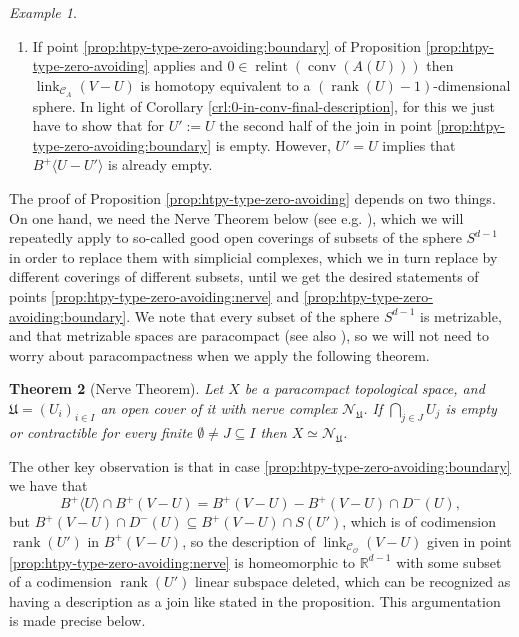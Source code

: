 \documentclass[a4paper,11pt,reqno, english]{amsart}
\newtheorem{theorem}{Theorem}[section]
\theoremstyle{definition}
\theoremstyle{remark}
\newtheorem{example}[theorem]{Example}
\newcommand\R{\mathbb R}
\DeclareMathOperator{\link}{\mathrm{link}}
\DeclareMathOperator{\relint}{\mathrm{relint}}
\DeclareMathOperator{\conv}{\mathrm{conv}}
\begin{document}
\begin{example}
\begin{enumerate}[resume,label=\normalfont{(\arabic*)}]
        \item If point \ref{prop:htpy-type-zero-avoiding:boundary} of Proposition \ref{prop:htpy-type-zero-avoiding} applies and $0\in\relint(\conv(A(U)))$ then $\link_{\mathscr{C}_A}(V-U)$ is homotopy equivalent to a $(\operatorname{rank}(U)-1)$-dimensional sphere. In light of Corollary \ref{crl:0-in-conv-final-description}, for this we just have to show that for $U':=U$ the second half of the join in point \ref{prop:htpy-type-zero-avoiding:boundary} is empty. However, $U'=U$ implies that $B^+\langle U-U'\rangle$ is already empty.
    \end{enumerate}
\end{example}
The proof of Proposition \ref{prop:htpy-type-zero-avoiding} depends on two things. On one hand, we need the Nerve Theorem below (see e.g. \cite[Corollary 4G.3]{Hatcher2002}), which we will repeatedly apply to so-called good open coverings of subsets of the sphere $S^{d-1}$ in order to replace them with simplicial complexes, which we in turn replace by different coverings of different subsets, until we get the desired statements of points \ref{prop:htpy-type-zero-avoiding:nerve} and \ref{prop:htpy-type-zero-avoiding:boundary}. We note that every subset of the sphere $S^{d-1}$ is metrizable, and that metrizable spaces are paracompact \cite{StoneMetricIsParacompact} (see also \cite{RudinParacompact}), so we will not need to worry about paracompactness when we apply the following theorem.
\begin{theorem}[Nerve Theorem]\label{thm:nerve}
    Let $X$ be a paracompact topological space, and $\mathfrak{U}=(U_i)_{i\in I}$ an open cover of it with nerve complex $\mathscr{N}_\mathfrak{U}$. If $\bigcap_{j\in J}U_j$ is empty or contractible for every finite $\emptyset\neq J\subseteq I$ then $X\simeq \mathscr{N}_\mathfrak{U}$.
\end{theorem}
The other key observation is that in case \ref{prop:htpy-type-zero-avoiding:boundary} we have that \[B^+\langle U\rangle\cap B^+(V-U)=B^+(V-U)-B^+(V-U)\cap D^-(U),\] but $B^+(V-U)\cap D^-(U)\subseteq B^+(V-U)\cap S(U')$, which is of codimension $\operatorname{rank}(U')$ in $B^+(V-U)$, so the description of $\link_{\mathscr{C}_\mathscr{O}}(V-U)$ given in point \ref{prop:htpy-type-zero-avoiding:nerve} is homeomorphic to $\R^{d-1}$ with some subset of a codimension $\operatorname{rank}(U')$ linear subspace deleted, which can be recognized as having a description as a join like stated in the proposition. This argumentation is made precise below.
\end{document}
